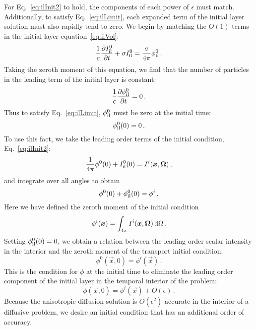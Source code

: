 For Eq.~\eqref{eq:ilInit2} to hold, the components of each power of
$\epsilon$ must match. Additionally, to satisfy Eq.~\eqref{eq:ilLimit}, each
expanded term of the initial layer solution must also rapidly
tend to zero. We begin by matching the $O(1)$ terms in the initial layer
equation~\eqref{eq:ilVol}:
\begin{equation}\label{eq:ilVolZeroth}
  \frac{1}{c}\frac{\partial I_\mathrm{il}^0}{\partial t}
  + \sigma I_\mathrm{il}^0
  = \frac{\sigma}{4\pi} \phi_\mathrm{il}^0 \,.
\end{equation}
Taking the zeroth moment of this equation, we find that the number of particles
in the leading term of the initial layer is constant:
\begin{equation}\label{eq:ilVolZeroth2}
  \frac{1}{c}\frac{\partial \phi_\mathrm{il}^0}{\partial t} = 0 \,.
\end{equation}
Thus to satisfy Eq.~\eqref{eq:ilLimit}, $\phi_\mathrm{il}^0$ must be zero at the initial
time:
\begin{equation*}
  \phi_\mathrm{il}^0(0) = 0\,.
\end{equation*}
To use this fact, we take the leading order terms of the initial condition,
Eq.~\eqref{eq:ilInit2}:
\begin{equation*}
 \frac{1}{4\pi} \phi^{0}(0) + I_\mathrm{il}^{0}(0) = I^i(\bm{x},\bm{\Omega})\,,
\end{equation*}
and integrate over all angles to obtain
\begin{equation}\label{eq:ilInitZeroth}
 \phi^{0}(0) + \phi_\mathrm{il}^{0}(0) = \phi^i\,.
\end{equation}
Here we have defined the zeroth moment of the initial condition
\begin{equation*}
  \phi^i(\bm{x}) = \int_{4\pi} I^i(\bm{x},\bm{\Omega}) \mathop{}\!\mathrm{d}\Omega\,.
\end{equation*}
Setting $\phi_\mathrm{il}^0(0) = 0$, we obtain a relation between the leading order scalar
intensity in the interior and the zeroth moment of the transport initial
condition:
\begin{equation}\label{eq:ilZeroth}
  \phi^{0}(\vec{x}, 0) = \phi^i(\vec{x})\,.
\end{equation}
This is the condition for $\phi$ at the initial time to eliminate the leading
order component of the initial layer in the temporal interior of the problem:
\begin{equation*}
  \phi(\vec{x},0) = \phi^i(\vec{x}) + O(\epsilon)\,.
\end{equation*}
Because the anisotropic diffusion solution is $O(\epsilon^2)$-accurate in the
interior of a diffusive problem, we desire an initial condition that has an
additional order of accuracy.

